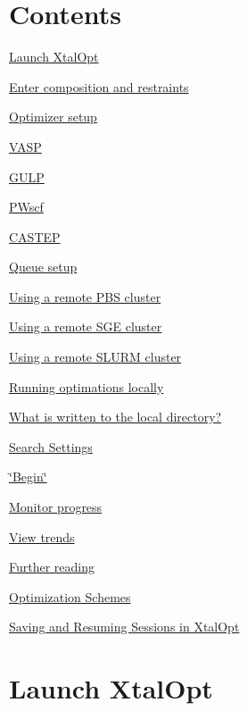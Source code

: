 \hypertarget{tut-xo_Contents}{}\section{Contents}\label{tut-xo_Contents}

\begin{DoxyItemize}
\item \hyperlink{tut-xo_launch}{Launch Xtal\+Opt}
\item \hyperlink{tut-xo_init}{Enter composition and restraints}
\item \hyperlink{tut-xo_opt}{Optimizer setup}
\begin{DoxyItemize}
\item \hyperlink{tut-xo_vasp-opt}{V\+A\+S\+P}
\item \hyperlink{tut-xo_gulp-opt}{G\+U\+L\+P}
\item \hyperlink{tut-xo_pwscf-opt}{P\+Wscf}
\item \hyperlink{tut-xo_castep-opt}{C\+A\+S\+T\+E\+P}
\end{DoxyItemize}
\item \hyperlink{tut-xo_qisetup}{Queue setup}
\begin{DoxyItemize}
\item \hyperlink{tut-xo_remotepbs}{Using a remote P\+B\+S cluster}
\item \hyperlink{tut-xo_remotesge}{Using a remote S\+G\+E cluster}
\item \hyperlink{tut-xo_remoteslurm}{Using a remote S\+L\+U\+R\+M cluster}
\item \hyperlink{tut-xo_localqi}{Running optimations locally}
\end{DoxyItemize}
\item \hyperlink{tut-xo_files}{What is written to the local directory?}
\item \hyperlink{tut-xo_search-set}{Search Settings}
\item \hyperlink{tut-xo_begin}{\char`\"{}\+Begin\char`\"{}}
\item \hyperlink{tut-xo_prog-mon}{Monitor progress}
\begin{DoxyItemize}
\item \hyperlink{tut-xo_trends}{View trends}
\end{DoxyItemize}
\item \hyperlink{tut-xo_xo_tut_further}{Further reading}
\begin{DoxyItemize}
\item \hyperlink{optschemes}{Optimization Schemes}
\item \hyperlink{xo_saveresume}{Saving and Resuming Sessions in Xtal\+Opt}
\end{DoxyItemize}
\end{DoxyItemize}\hypertarget{tut-xo_launch}{}\section{Launch Xtal\+Opt}\label{tut-xo_launch}
